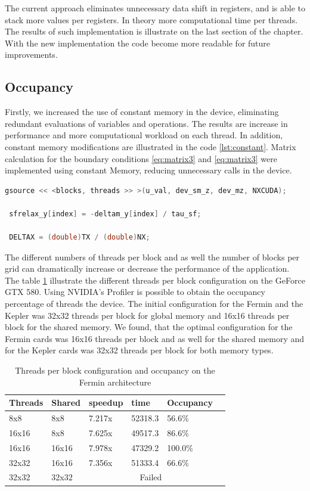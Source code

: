 The current approach eliminates unnecessary data shift in registers, and is able to stack more values per registers. In theory more computational time per threads. The results of such implementation is illustrate on the last section of the chapter. With the new implementation the code become more readable for future improvements. 

\subsection{Occupancy}
 
Firstly, we increased the use of constant memory in the device, eliminating redundant evaluations of variables and operations. The results are increase in performance and more computational workload on each thread. In addition, constant memory modifications are illustrated in the code \ref{lst:constant}. Matrix calculation for the boundary conditions \ref{eq:matrix3} and \ref{eq:matrix3} were implemented using constant Memory, reducing unnecessary calls in the device.
 
 \begin{lstlisting}[language=C++,  label={lst:constant}, caption={Constant Memory changes}]
 gsource << <blocks, threads >> >(u_val, dev_sm_z, dev_mz, NXCUDA);
 
 sfrelax_y[index] = -deltam_y[index] / tau_sf;
     
 DELTAX = (double)TX / (double)NX;
\end{lstlisting}
 
The different numbers of threads per block and as well the number of blocks per grid can dramatically increase or decrease the performance of the application. The table \ref{tab:ocu} illustrate the different threads per block configuration on the GeForce GTX 580. Using NVIDIA's Profiler is possible to obtain the occupancy percentage of threads the device. The initial configuration for the Fermin and the Kepler was 32x32 threads per block for global memory and 16x16 threads per block for the shared memory. We found, that the optimal configuration for the Fermin cards was 16x16 threads per block and as well for the shared memory and for the Kepler cards was 32x32 threads per block for both memory types. 

\begin{table}[h]
\centering
  \begin{tabular} { | l | l | l | l | l | l | }
    \hline
    Threads & Shared & speedup & time & Occupancy \\
    \hline
     8x8 &  8x8 & 7.217x & 52318.3  & 56.6\% \\
    \hline
     16x16 & 8x8 & 7.625x & 49517.3 & 86.6\% \\
    \hline
    16x16 & 16x16 & 7.978x & 47329.2 & 100.0\% \\
    \hline
    32x32 & 16x16 & 7.356x & 51333.4 & 66.6\% \\
    \hline
    32x32 & 32x32 & \multicolumn{3}{|c|}{Failed}\\
    \hline
  \end{tabular}
  \caption{Threads per block configuration and occupancy on the Fermin architecture}
  \label{tab:ocu}
  \end{table}


